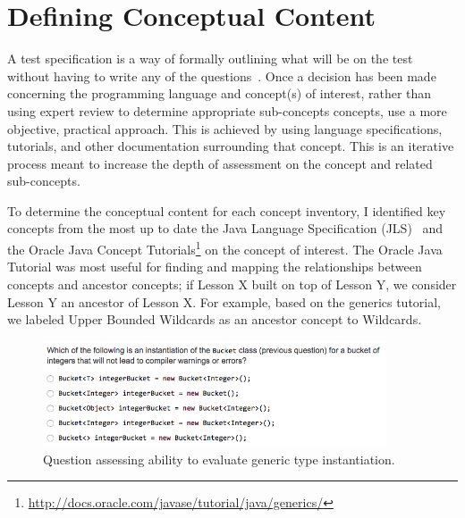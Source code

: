 \section{Defining Conceptual Content}

A test specification is a way of formally outlining what will be on the test without having to write any of the questions~\cite{tew2010developing}. Once a decision has been made concerning the programming language and concept(s) of interest, rather than using expert review to determine appropriate sub-concepts concepts, use a more objective, practical approach. This is achieved by using language specifications, tutorials, and other documentation surrounding that concept. This is an iterative process meant to increase the depth of assessment on the concept and related sub-concepts.

To determine the conceptual content for each concept inventory, I identified key concepts from the most up to date the Java Language Specification (JLS)~\cite{Gosling:1996:JLS:560667} and the Oracle Java Concept Tutorials\footnote{\url{http://docs.oracle.com/javase/tutorial/java/generics/}} on the concept of interest. The Oracle Java Tutorial was most useful for finding and mapping the relationships between concepts and ancestor concepts; if Lesson X built on top of Lesson Y, we consider Lesson Y an ancestor of Lesson X. For example, based on the generics tutorial, we labeled Upper Bounded Wildcards as an ancestor concept to Wildcards. 

	\begin{figure}[ht]
		\centering
		\includegraphics[width=4in]{Chapter-5/figs/generics-Q2.png}
		\caption{Question assessing ability to evaluate generic type instantiation.\label{fig:Q2}}
	\end{figure}	
	
